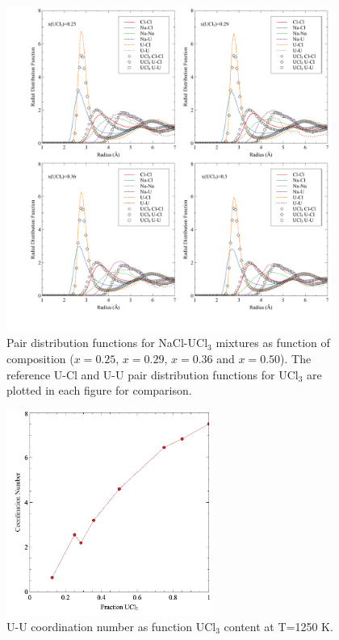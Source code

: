 \documentclass[preprint,3p,10pt,onecolumn,number,sort&compress]{elsarticle}
\begin{document}
 \begin{figure}[htb]
\centering
\includegraphics[width=0.95\textwidth]{fig13.pdf}
\caption{Pair distribution functions for NaCl-UCl$_3$ mixtures as function of composition ($x=0.25$, $x=0.29$, $x=0.36$ and $x=0.50$). The reference U-Cl and U-U pair distribution functions for UCl$_3$ are plotted in each figure for comparison.} 
\label{fig:fig_pair}
\end{figure}


 \begin{figure}[htb]
\centering
\includegraphics[width=0.6\textwidth]{fig14.jpg}
\caption{U-U coordination number as function UCl$_3$ content at T=1250 K.} 
\label{fig:fig_coord}
\end{figure}
\end{document}
